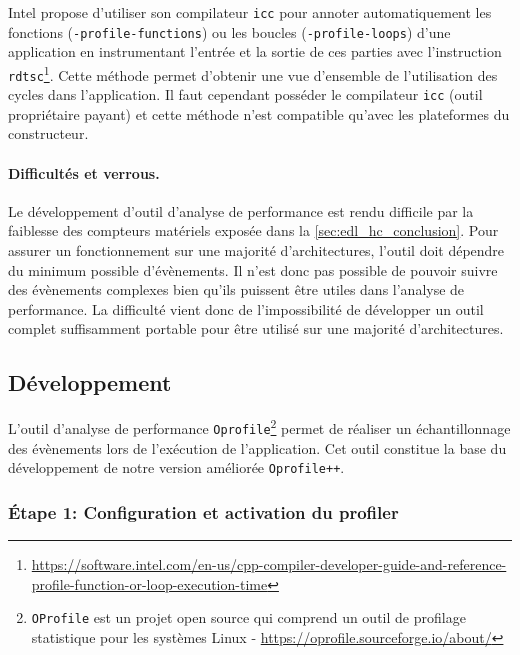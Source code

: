         Intel propose d'utiliser son compilateur \verb=icc= pour annoter automatiquement les fonctions (\verb=-profile-functions=) ou les boucles (\verb=-profile-loops=) d'une application en instrumentant l'entrée et la sortie de ces parties avec l'instruction \verb=rdtsc=\footnote{\url{https://software.intel.com/en-us/cpp-compiler-developer-guide-and-reference-profile-function-or-loop-execution-time}}. Cette méthode permet d'obtenir une vue d'ensemble de l'utilisation des cycles dans l'application. Il faut cependant posséder le compilateur \verb=icc= (outil propriétaire payant) et cette méthode n'est compatible qu'avec les plateformes du constructeur. 
        
        
        \paragraph{Difficultés et verrous.} Le développement d'outil d'analyse de performance est rendu difficile par la faiblesse des compteurs matériels exposée dans la \autoref{sec:edl_hc_conclusion}. Pour assurer un fonctionnement sur une majorité d'architectures, l'outil doit dépendre du minimum possible d'évènements. Il n'est donc pas possible de pouvoir suivre des évènements complexes bien qu'ils puissent être utiles dans l'analyse de performance. La difficulté vient donc de l'impossibilité de développer un outil complet suffisamment portable pour être utilisé sur une majorité d'architectures. 
        

\subsection{Développement}

    L'outil d'analyse de performance \verb=Oprofile=\footnote{\texttt{OProfile} est un projet open source qui comprend un outil de profilage statistique pour les systèmes Linux -  \url{https://oprofile.sourceforge.io/about/}} permet de réaliser un échantillonnage des évènements lors de l'exécution de l'application. Cet outil constitue la base du développement de notre version améliorée \verb=Oprofile++=.
    
    \subsubsection{Étape 1: Configuration et activation du profiler}
        
